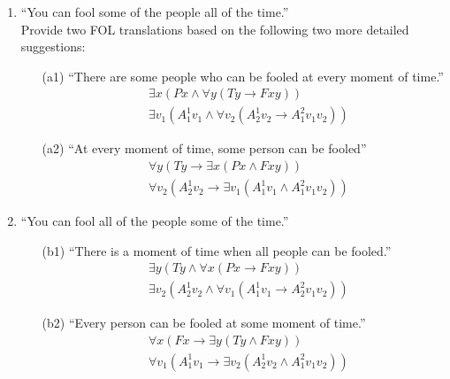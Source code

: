 \documentclass[11pt]{article}
\begin{document}
  \begin{enumerate}
    \item ``You can fool some of the people all of the time.'' \\
      Provide two FOL translations based on the following two more detailed suggestions:
      \begin{enumerate}
        \item[(a1)] ``There are some people who can be fooled at every moment of time.''
          \begin{align*}
            &\exists x (P x \wedge \forall y (T y \to F x y)) \\
            &\exists v_1 (A_1^1 v_1 \wedge \forall v_2 (A_2^1 v_2 \to A_1^2 v_1 v_2))
          \end{align*}
        \item[(a2)] ``At every moment of time, some person can be fooled''
          \begin{align*}
            &\forall y (T y \to \exists x (P x \wedge F x y)) \\
            &\forall v_2 (A_2^1 v_2 \to \exists v_1 (A_1^1 v_1 \wedge A_1^2 v_1 v_2))
          \end{align*}
      \end{enumerate}

    \item ``You can fool all of the people some of the time.''
      \begin{enumerate}
        \item[(b1)] ``There is a moment of time when all people can be fooled.''
          \begin{align*}
            &\exists y (T y \wedge \forall x (P x \to F x y)) \\
            &\exists v_2 (A_2^1 v_2 \wedge \forall v_1 (A_1^1 v_1 \to A_2^2 v_1 v_2))
          \end{align*}
        \item[(b2)] ``Every person can be fooled at some moment of time.''
          \begin{align*}
            &\forall x (F x \to \exists y (T y \wedge F x y)) \\
            &\forall v_1 (A_1^1 v_1 \to \exists v_2 (A_2^1 v_2 \wedge A_1^2 v_1 v_2))
          \end{align*}
      \end{enumerate}


\end{enumerate}
\end{document}
